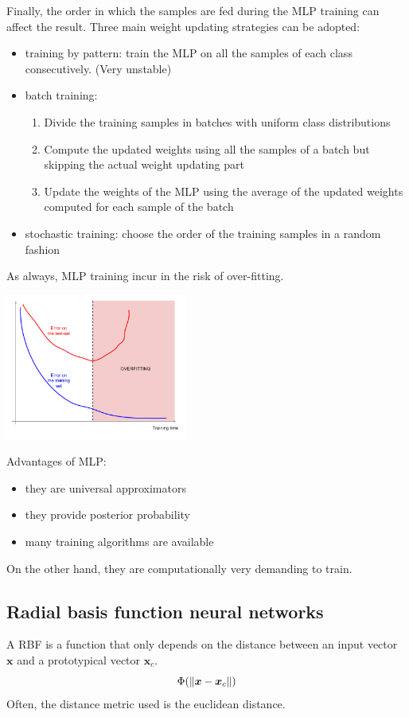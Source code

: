 \documentclass[oneside,onecolumn]{report}
\begin{document}
Finally, the order in which the samples are fed during the MLP training can affect the result.
Three main weight updating strategies can be adopted:
\begin{itemize}
    \item training by pattern: train the MLP on all the samples of each class consecutively. (Very unstable)

    \item batch training:
    \begin{enumerate}
        \item Divide the training samples in batches with uniform class distributions
        \item Compute the updated weights using all the samples of a batch but skipping the actual weight updating part
        \item Update the weights of the MLP using the average of the updated weights computed for each sample of the batch
    \end{enumerate}

    \item stochastic training: choose the order of the training samples in a random fashion
\end{itemize}

As always, MLP training incur in the risk of over-fitting.
\begin{center}
    \includegraphics[width=6cm]{mlp_overfitting.png}
\end{center}

Advantages of MLP:
\begin{itemize}
    \item they are universal approximators
    \item they provide posterior probability
    \item many training algorithms are available
\end{itemize}
On the other hand, they are computationally very demanding to train.


\subsection{Radial basis function neural networks}
A RBF is a function that only depends on the distance between an input vector $\bm x$ and a prototypical vector $\bm x_c$.
$$ \Phi(\norm{\bm x - \bm x_c}) $$
Often, the distance metric used is the euclidean distance.
\end{document}
